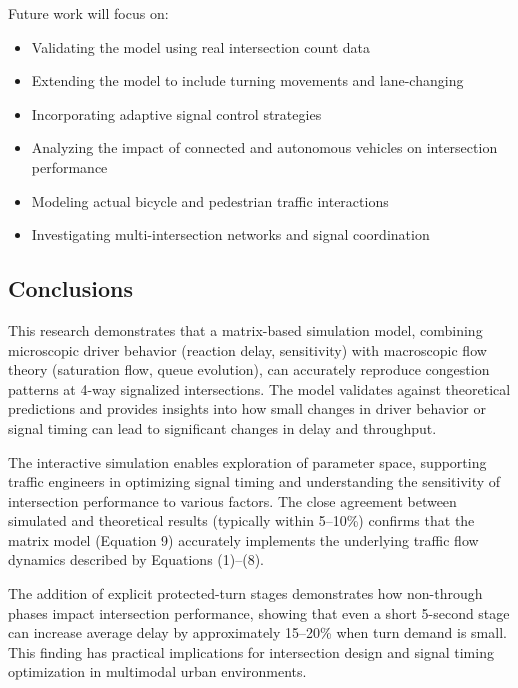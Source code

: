 Future work will focus on:
\begin{itemize}
    \item Validating the model using real intersection count data
    \item Extending the model to include turning movements and lane-changing
    \item Incorporating adaptive signal control strategies
    \item Analyzing the impact of connected and autonomous vehicles on intersection performance
    \item Modeling actual bicycle and pedestrian traffic interactions
    \item Investigating multi-intersection networks and signal coordination
\end{itemize}

\subsection{Conclusions}

This research demonstrates that a matrix-based simulation model, combining microscopic driver behavior (reaction delay, sensitivity) with macroscopic flow theory (saturation flow, queue evolution), can accurately reproduce congestion patterns at 4-way signalized intersections. The model validates against theoretical predictions and provides insights into how small changes in driver behavior or signal timing can lead to significant changes in delay and throughput.

The interactive simulation enables exploration of parameter space, supporting traffic engineers in optimizing signal timing and understanding the sensitivity of intersection performance to various factors. The close agreement between simulated and theoretical results (typically within 5--10\%) confirms that the matrix model (Equation 9) accurately implements the underlying traffic flow dynamics described by Equations (1)--(8).

The addition of explicit protected-turn stages demonstrates how non-through phases impact intersection performance, showing that even a short 5-second stage can increase average delay by approximately 15--20\% when turn demand is small. This finding has practical implications for intersection design and signal timing optimization in multimodal urban environments.

